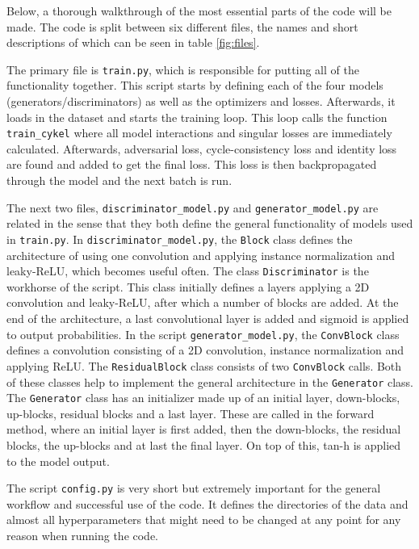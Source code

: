 \documentclass[12pt, fleqn, titlepage]{article}
\begin{document}
\noindent Below, a thorough walkthrough of the most essential parts of the code will be made. The code is split between six different files, the names and short descriptions of which can be seen in table \ref{fig:files}. 

The primary file is \texttt{train.py}, which is responsible for putting all of the functionality together. This script starts by defining each of the four models (generators/discriminators) as well as the optimizers and losses. Afterwards, it loads in the dataset and starts the training loop. This loop calls the function \texttt{train\_cykel} where all model interactions and singular losses are immediately calculated. Afterwards, adversarial loss, cycle-consistency loss and identity loss are found and added to get the final loss. This loss is then backpropagated through the model and the next batch is run.

The next two files, \texttt{discriminator\_model.py} and \texttt{generator\_model.py} are related in the sense that they both define the general functionality of models used in \texttt{train.py}. In \texttt{discriminator\_model.py}, the \texttt{Block} class defines the architecture of using one convolution and applying instance normalization and leaky-ReLU, which becomes useful often. The class \texttt{Discriminator} is the workhorse of the script. This class initially defines a layers applying a 2D convolution and leaky-ReLU, after which a number of blocks are added. At the end of the architecture, a last convolutional layer is added and sigmoid is applied to output probabilities. In the script \texttt{generator\_model.py}, the \texttt{ConvBlock} class defines a convolution consisting of a 2D convolution, instance normalization and applying ReLU. The \texttt{ResidualBlock} class consists of two \texttt{ConvBlock} calls. Both of these classes help to implement the general architecture in the \texttt{Generator} class. The \texttt{Generator} class has an initializer made up of an initial layer, down-blocks, up-blocks, residual blocks and a last layer. These are called in the forward method, where an initial layer is first added, then the down-blocks, the residual blocks, the up-blocks and at last the final layer. On top of this, tan-h is applied to the model output.

The script \texttt{config.py} is very short but extremely important for the general workflow and successful use of the code. It defines the directories of the data and almost all hyperparameters that might need to be changed at any point for any reason when running the code.
\end{document}
